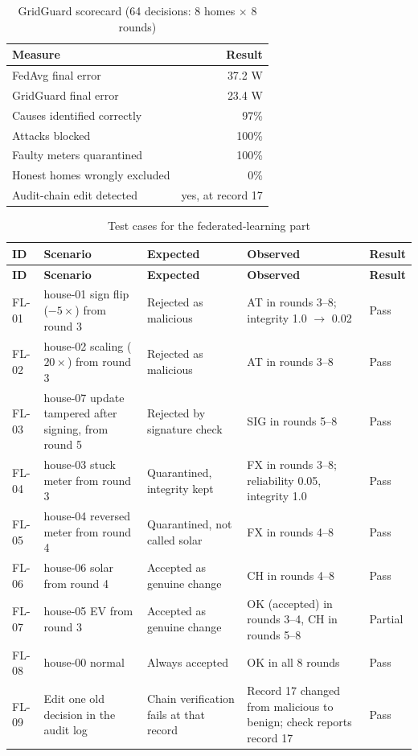\documentclass[12pt,a4paper,oneside]{report}
\begin{document}
\begin{table}[H]
\centering
\caption{GridGuard scorecard (64 decisions: 8 homes $\times$ 8 rounds)}
\label{tab:score}
\small
\begin{tabular}{lr}
\toprule
\textbf{Measure} & \textbf{Result}\\
\midrule
FedAvg final error & 37.2 W \\
GridGuard final error & 23.4 W \\
Causes identified correctly & 97\% \\
Attacks blocked & 100\% \\
Faulty meters quarantined & 100\% \\
Honest homes wrongly excluded & 0\% \\
Audit-chain edit detected & yes, at record 17 \\
\bottomrule
\end{tabular}
\end{table}

\begin{longtable}{>{\raggedright\arraybackslash}p{1.15cm} >{\raggedright\arraybackslash}p{3.4cm} >{\raggedright\arraybackslash}p{3.85cm} >{\raggedright\arraybackslash}p{3.85cm} >{\raggedright\arraybackslash}p{1.15cm}}
\caption{Test cases for the federated-learning part}\label{tab:fltc}\\
\toprule
\textbf{ID} & \textbf{Scenario} & \textbf{Expected} & \textbf{Observed} & \textbf{Result}\\
\midrule
\endfirsthead
\toprule
\textbf{ID} & \textbf{Scenario} & \textbf{Expected} & \textbf{Observed} & \textbf{Result}\\
\midrule
\endhead
FL-01 & house-01 sign flip ($-5\times$) from round 3 & Rejected as malicious & AT in rounds 3--8; integrity 1.0 $\to$ 0.02 & Pass \\
FL-02 & house-02 scaling ($20\times$) from round 3 & Rejected as malicious & AT in rounds 3--8 & Pass \\
FL-03 & house-07 update tampered after signing, from round 5 & Rejected by signature check & SIG in rounds 5--8 & Pass \\
FL-04 & house-03 stuck meter from round 3 & Quarantined, integrity kept & FX in rounds 3--8; reliability 0.05, integrity 1.0 & Pass \\
FL-05 & house-04 reversed meter from round 4 & Quarantined, not called solar & FX in rounds 4--8 & Pass \\
FL-06 & house-06 solar from round 4 & Accepted as genuine change & CH in rounds 4--8 & Pass \\
FL-07 & house-05 EV from round 3 & Accepted as genuine change & OK (accepted) in rounds 3--4, CH in rounds 5--8 & Partial \\
FL-08 & house-00 normal & Always accepted & OK in all 8 rounds & Pass \\
FL-09 & Edit one old decision in the audit log & Chain verification fails at that record & Record 17 changed from malicious to benign; check reports record 17 & Pass \\
\bottomrule
\end{longtable}
\end{document}
